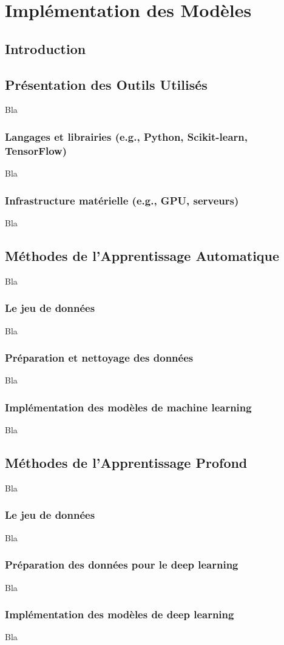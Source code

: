 ﻿\chapter{Implémentation des Modèles}

\section{Introduction}

\section{Présentation des Outils Utilisés}

Bla

\subsection{Langages et librairies (e.g., Python, Scikit-learn, TensorFlow)}

Bla

\subsection{Infrastructure matérielle (e.g., GPU, serveurs)}

Bla

\section{Méthodes de l'Apprentissage Automatique}

Bla

\subsection{Le jeu de données}

Bla

\subsection{Préparation et nettoyage des données}

Bla

\subsection{Implémentation des modèles de machine learning}

Bla

\section{Méthodes de l'Apprentissage Profond}

Bla

\subsection{Le jeu de données}

Bla

\subsection{Préparation des données pour le deep learning}

Bla

\subsection{Implémentation des modèles de deep learning}

Bla
